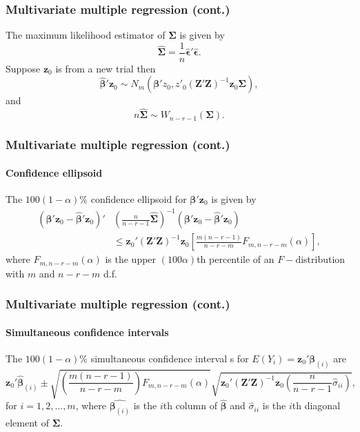 \documentclass{beamer}
\begin{document}
	\begin{frame}
		\frametitle{Multivariate multiple regression (cont.)}
		The maximum likelihood estimator of $\pmb{ \Sigma }$ is given by
		\[ \hat{\pmb{ \Sigma }} = \frac{ 1 }{ n } \hat{ \pmb{ \epsilon } }' \hat{\pmb{ \epsilon }}. \]
		Suppose $\pmb{ z }_{ 0 }$ is from a new trial then 
		\[ \hat{ \pmb{ \beta } }' \pmb{ z }_0 \sim N_m( \pmb{ \beta }' z_0, z'_0( \pmb{ Z }'\pmb{ Z } )^ { -1 } \pmb{ z }_0 \pmb{ \Sigma } ), \]
		and 
		\[ n \hat{ \pmb{ \Sigma } } \sim W_{ n - r - 1 }( \pmb{ \Sigma } ). \]
	\end{frame}
	
	\begin{frame}
		\frametitle{Multivariate multiple regression (cont.)}
		\framesubtitle{Confidence ellipsoid}
		The $100( 1 - \alpha )\%$ confidence ellipsoid for $\pmb{ \beta }'\pmb{ z }_0$ is given by
		\begin{equation*}
		\begin{split}
			( \pmb{ \beta }'\pmb{z}_0 - \hat{\pmb{ \beta }}'\pmb{z}_0 )' & \left( \frac{ n }{ n - r - 1 } \hat{ \pmb{ \Sigma } } \right) ^ { -1 } ( \pmb{ \beta }'\pmb{z}_0 - \hat{\pmb{ \beta }}'\pmb{z}_0 ) \\
			& \leq \pmb{ z }_0'( \pmb{ Z }' \pmb{ Z } ) ^ { -1 } \pmb{ z }_0 \left[ \frac{ m( n - r - 1 ) }{ n - r - m } F_{ m, n - r - m }( \alpha ) \right],
		\end{split}
		\end{equation*}
		where $F_{ m, n - r - m }( \alpha )$ is the upper $(100\alpha)$th percentile of an $F-$distribution with $m$ and $n - r - m$ d.f.
	\end{frame}
	
	\begin{frame}
		\frametitle{Multivariate multiple regression (cont.)}
		\framesubtitle{Simultaneous confidence intervals}
		The $100( 1 - \alpha )\%$ simultaneous confidence interval s for $E( Y_i ) = \pmb{z}_0' \pmb{ \beta }_{ ( i ) }$ are 
		\begin{equation*}
			\pmb{ z }_0' \hat{ \pmb{ \beta } }_{ ( i ) } \pm \sqrt{ \left( \frac{ m( n - r - 1 ) }{ n - r - m } \right) F_{ m, n - r - m }( \alpha ) } \sqrt{ \pmb{ z }_0'( \pmb{ Z }' \pmb{ Z } ) ^ { -1 } \pmb{ z }_0 \left( \frac{ n }{ n - r - 1 } \hat{ \sigma }_{ ii } \right) },
		\end{equation*}
		for $i = 1, 2, \dots, m$, where $\hat{ \pmb{ \beta }_{ ( i ) } }$ is the $i$th column of $\hat{ \pmb{ \beta } }$ and $\hat{ \sigma }_{ ii }$ is the $i$th diagonal element of $\pmb{ \Sigma }$.
		
	\end{frame}

	\begin{frame}[allowframebreaks]
		\begin{singlespace}
			
			
		\end{singlespace}
	\end{frame}
\end{document}
